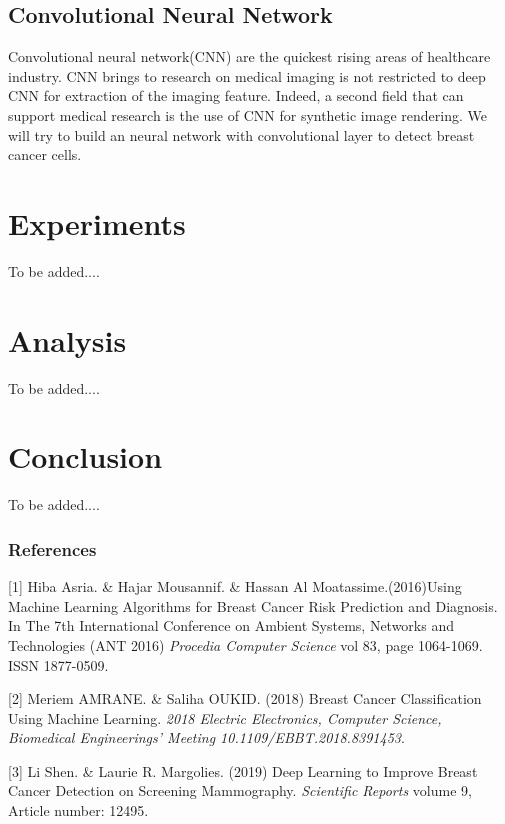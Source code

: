 \documentclass{article} %
\begin{document}
\subsection{Convolutional Neural Network}

Convolutional neural network(CNN) are the quickest rising areas of healthcare industry. CNN brings to research on medical imaging is not restricted to deep CNN for extraction of the imaging feature. Indeed, a second field that can support medical research is the use of CNN for synthetic image rendering. We will try to build an neural network with convolutional layer to detect breast cancer cells. 

\section{Experiments}
To be added....
\section{Analysis}
To be added....
\section{Conclusion}
To be added....
\subsubsection*{References}

\small{

[1] Hiba Asria. \& Hajar Mousannif. \& Hassan Al Moatassime.(2016)Using Machine Learning Algorithms for Breast Cancer Risk Prediction and Diagnosis. In The 7th International Conference on Ambient Systems, Networks and Technologies (ANT 2016) 
{\it Procedia Computer Science} vol 83, page 1064-1069. ISSN 1877-0509.


[2] Meriem AMRANE. \& Saliha OUKID. (2018) Breast Cancer Classification Using Machine Learning. {\it 2018 Electric Electronics, Computer Science, Biomedical Engineerings' Meeting 10.1109/EBBT.2018.8391453}.

[3] Li Shen. \& Laurie R. Margolies. (2019) Deep Learning to Improve Breast
Cancer Detection on Screening Mammography. {\it Scientific Reports} volume 9, Article number: 12495.
}
\end{document}
